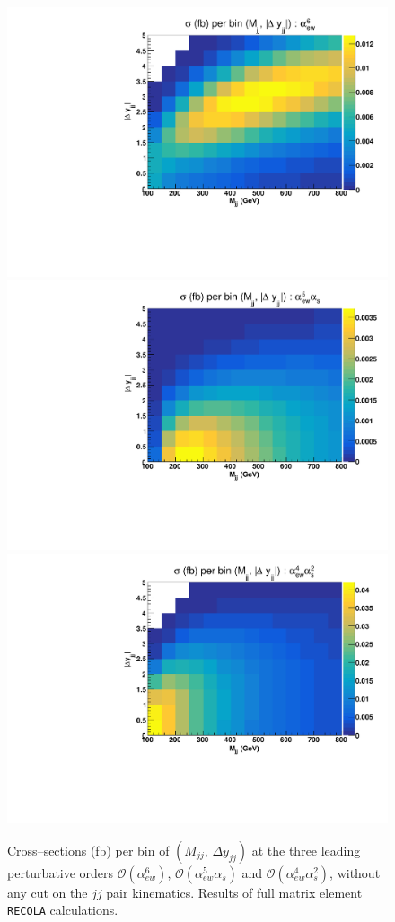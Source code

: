 \begin{figure}[ht]
\centering
\includegraphics[scale=0.395]{figures/scanfigures/scan_ew6.pdf}
\includegraphics[scale=0.395]{figures/scanfigures/scan_ew5qcd1.pdf}
\includegraphics[scale=0.395]{figures/scanfigures/scan_ew4qcd2.pdf}
\caption{Cross--sections (fb) per bin of $(M_{jj},\,\Delta y_{jj})$ at the three leading perturbative orders $\mathcal{O}(\alpha_{ew}^6)$, $\mathcal{O}(\alpha_{ew}^5\alpha_s)$ and $\mathcal{O}(\alpha_{ew}^4 \alpha_s^2)$, without any cut on the $jj$ pair kinematics. Results of full matrix element \texttt{RECOLA} calculations.}\label{fig:mjjdyjj_2d_LO}
\end{figure}

